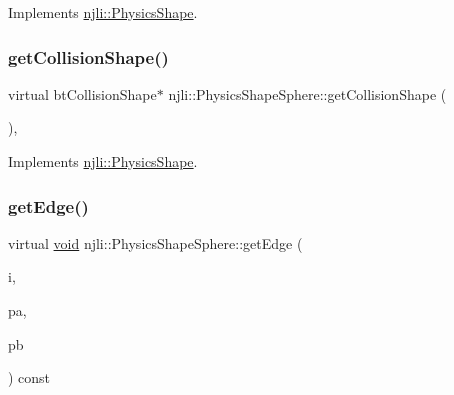 Implements \mbox{\hyperlink{classnjli_1_1_physics_shape_a527e956caca24bf16ed0d47f69ff14e8}{njli\+::\+Physics\+Shape}}.

\mbox{\label{classnjli_1_1_physics_shape_sphere_a8929b088f8eac7b80215679f24da1abe}} 
\subsubsection{\texorpdfstring{get\+Collision\+Shape()}{getCollisionShape()}\hspace{0.1cm}{\footnotesize\ttfamily [2/2]}}
{\footnotesize\ttfamily virtual bt\+Collision\+Shape$\ast$ njli\+::\+Physics\+Shape\+Sphere\+::get\+Collision\+Shape (\begin{DoxyParamCaption}{ }\end{DoxyParamCaption})\hspace{0.3cm}{\ttfamily [protected]}, {\ttfamily [virtual]}}



Implements \mbox{\hyperlink{classnjli_1_1_physics_shape_a2910f0362035c971f245349a55378b01}{njli\+::\+Physics\+Shape}}.

\mbox{\label{classnjli_1_1_physics_shape_sphere_a562b1cdfde0a2428ee66802df4878183}} 
\subsubsection{\texorpdfstring{get\+Edge()}{getEdge()}}
{\footnotesize\ttfamily virtual \mbox{\hyperlink{_thread_8h_af1e856da2e658414cb2456cb6f7ebc66}{void}} njli\+::\+Physics\+Shape\+Sphere\+::get\+Edge (\begin{DoxyParamCaption}\item[{int}]{i,  }\item[{bt\+Vector3 \&}]{pa,  }\item[{bt\+Vector3 \&}]{pb }\end{DoxyParamCaption}) const\hspace{0.3cm}{\ttfamily [virtual]}}

